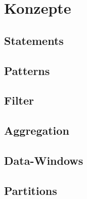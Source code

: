 \chapter{Konzepte}

\section{Statements}

\section{Patterns}

\section{Filter}

\section{Aggregation}

\section{Data-Windows}

\section{Partitions}